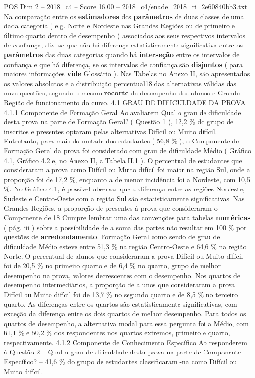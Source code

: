 \begin{textsample}{POS Dim 2 – 2018\_c4 – Score 16.00 – 2018\_c4/enade\_2018\_ri\_2e60840bb3.txt}
Na comparação entre os \textbf{estimadores} dos \textbf{parâmetros} de duas classes de uma dada categoria ( e.g.
Norte e Nordeste nas Grandes Regiões ou de primeiro e último quarto dentro de desempenho ) associados aos seus respectivos intervalos de confiança, diz -se que não há diferença estatisticamente significativa entre os \textbf{parâmetros} das duas categorias quando há \textbf{interseção} entre os intervalos de confiança e que há diferença, se os intervalos de confiança são \textbf{disjuntos} ( para maiores informações \textbf{vide} Glossário ).
Nas Tabelas no Anexo II, são apresentados os valores absolutos e a distribuição percentual18 das alternativas válidas das nove questões, segundo o mesmo \textbf{recorte} de desempenho dos alunos e Grande Região de funcionamento do curso. 4.1 GRAU DE DIFICULDADE DA PROVA 4.1.1 Componente de Formação Geral Ao avaliarem Qual o grau de dificuldade desta prova na parte de Formação Geral? ( Questão 1 ), 12,2 \% do grupo de inscritos e presentes optaram pelas alternativas Difícil ou Muito difícil.
Entretanto, para mais da metade dos estudantes ( 56,8 \% ), o Componente de Formação Geral da prova foi considerado com grau de dificuldade Médio ( Gráfico 4.1, Gráfico 4.2 e, no Anexo II, a Tabela II.1 ).
O percentual de estudantes que consideraram a prova como Difícil ou Muito difícil foi maior na região Sul, onde a proporção foi de 17,2 \%, enquanto a de menor incidência foi a Nordeste, com 10,5 \%.
No Gráfico 4.1, é possível observar que a diferença entre as regiões Nordeste, Sudeste e Centro-Oeste com a região Sul são estatisticamente significativas.
Nas Grandes Regiões, a proporção de presentes à prova que consideraram o Componente de 18 Cumpre lembrar uma das convenções para tabelas \textbf{numéricas} ( pág. iii ) sobre a possibilidade de a soma das partes não resultar em 100 \% por questões de \textbf{arredondamento}.
Formação Geral como sendo de grau de dificuldade Médio esteve entre 51,3 \% na região Centro-Oeste e 64,6 \% na região Norte.
O percentual de alunos que consideraram a prova Difícil ou Muito difícil foi de 20,5 \% no primeiro quarto e de 6,4 \% no quarto, grupo de melhor desempenho na prova, valores decrescentes com o desempenho.
Nos quartos de desempenho intermediários, a proporção de alunos que consideraram a prova Difícil ou Muito difícil foi de 13,7 \% no segundo quarto e de 8,5 \% no terceiro quarto.
As diferenças entre os quartos são estatisticamente significativas, com exceção da diferença entre os dois quartos de melhor desempenho.
Para todos os quartos de desempenho, a alternativa modal para essa pergunta foi a Médio, com 61,1 \% e 50,2 \% dos respondentes nos quartos extremos, primeiro e quarto, respectivamente. 4.1.2 Componente de Conhecimento Específico Ao responderem à Questão 2 – Qual o grau de dificuldade desta prova na parte de Componente Específico? – 41,6 \% do grupo de estudantes classificaram -na como Difícil ou Muito difícil.

\end{textsample}
